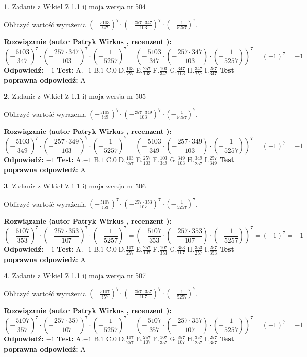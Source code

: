 \documentclass[12pt, a4paper]{article}
\theoremstyle{definition} %
\newtheorem{zad}{}
\newcommand{\zadStart}[1]{\begin{zad}#1\newline}
\newcommand{\zadStop}{\end{zad}}
\newcommand{\rozwStart}[2]{\noindent \textbf{Rozwiązanie (autor #1 , recenzent #2): }\newline}
\newcommand{\rozwStop}{\newline}
\newcommand{\odpStart}{\noindent \textbf{Odpowiedź:}\newline}
\newcommand{\odpStop}{\newline}
\newcommand{\testStart}{\noindent \textbf{Test:}\newline}
\newcommand{\testStop}{\newline}
\newcommand{\kluczStart}{\noindent \textbf{Test poprawna odpowiedź:}\newline}
\newcommand{\kluczStop}{\newline}
\begin{document}
\zadStart{Zadanie z Wikieł Z 1.1 i) moja wersja nr 504}

Obliczyć wartość wyrażenia $(-\frac{5103}{347})^{7} \cdot (-\frac{257 \cdot 347}{103})^{7} \cdot (-\frac{1}{5257})^{7}$.
\zadStop
\rozwStart{Patryk Wirkus}{}
$$(-\frac{5103}{347})^{7} \cdot (-\frac{257 \cdot 347}{103})^{7} \cdot (-\frac{1}{5257})^{7} = (-\frac{5103}{347} \cdot (-\frac{257 \cdot 347}{103}) \cdot (-\frac{1}{5257}))^{7} = (-1)^{7} = -1$$
\rozwStop
\odpStart
$-1$
\odpStop
\testStart
A.$-1$ B.$1$ C.$0$ D.$\frac{103}{257}$ E.$\frac{257}{103}$
F.$\frac{103}{347}$ G.$\frac{347}{103}$
H.$\frac{347}{257}$
I.$\frac{257}{347}$
\testStop
\kluczStart
A
\kluczStop



\zadStart{Zadanie z Wikieł Z 1.1 i) moja wersja nr 505}

Obliczyć wartość wyrażenia $(-\frac{5103}{349})^{7} \cdot (-\frac{257 \cdot 349}{103})^{7} \cdot (-\frac{1}{5257})^{7}$.
\zadStop
\rozwStart{Patryk Wirkus}{}
$$(-\frac{5103}{349})^{7} \cdot (-\frac{257 \cdot 349}{103})^{7} \cdot (-\frac{1}{5257})^{7} = (-\frac{5103}{349} \cdot (-\frac{257 \cdot 349}{103}) \cdot (-\frac{1}{5257}))^{7} = (-1)^{7} = -1$$
\rozwStop
\odpStart
$-1$
\odpStop
\testStart
A.$-1$ B.$1$ C.$0$ D.$\frac{103}{257}$ E.$\frac{257}{103}$
F.$\frac{103}{349}$ G.$\frac{349}{103}$
H.$\frac{349}{257}$
I.$\frac{257}{349}$
\testStop
\kluczStart
A
\kluczStop



\zadStart{Zadanie z Wikieł Z 1.1 i) moja wersja nr 506}

Obliczyć wartość wyrażenia $(-\frac{5107}{353})^{7} \cdot (-\frac{257 \cdot 353}{107})^{7} \cdot (-\frac{1}{5257})^{7}$.
\zadStop
\rozwStart{Patryk Wirkus}{}
$$(-\frac{5107}{353})^{7} \cdot (-\frac{257 \cdot 353}{107})^{7} \cdot (-\frac{1}{5257})^{7} = (-\frac{5107}{353} \cdot (-\frac{257 \cdot 353}{107}) \cdot (-\frac{1}{5257}))^{7} = (-1)^{7} = -1$$
\rozwStop
\odpStart
$-1$
\odpStop
\testStart
A.$-1$ B.$1$ C.$0$ D.$\frac{107}{257}$ E.$\frac{257}{107}$
F.$\frac{107}{353}$ G.$\frac{353}{107}$
H.$\frac{353}{257}$
I.$\frac{257}{353}$
\testStop
\kluczStart
A
\kluczStop



\zadStart{Zadanie z Wikieł Z 1.1 i) moja wersja nr 507}

Obliczyć wartość wyrażenia $(-\frac{5107}{357})^{7} \cdot (-\frac{257 \cdot 357}{107})^{7} \cdot (-\frac{1}{5257})^{7}$.
\zadStop
\rozwStart{Patryk Wirkus}{}
$$(-\frac{5107}{357})^{7} \cdot (-\frac{257 \cdot 357}{107})^{7} \cdot (-\frac{1}{5257})^{7} = (-\frac{5107}{357} \cdot (-\frac{257 \cdot 357}{107}) \cdot (-\frac{1}{5257}))^{7} = (-1)^{7} = -1$$
\rozwStop
\odpStart
$-1$
\odpStop
\testStart
A.$-1$ B.$1$ C.$0$ D.$\frac{107}{257}$ E.$\frac{257}{107}$
F.$\frac{107}{357}$ G.$\frac{357}{107}$
H.$\frac{357}{257}$
I.$\frac{257}{357}$
\testStop
\kluczStart
A
\kluczStop
\end{document}
